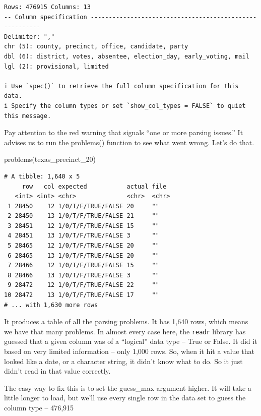 \documentclass[
  letterpaper,
  DIV=11,
  numbers=noendperiod]{scrreprt}
\newenvironment{Shaded}{\begin{snugshade}}{\end{snugshade}}
\newcommand{\FunctionTok}[1]{\textcolor[rgb]{0.28,0.35,0.67}{#1}}
\newcommand{\NormalTok}[1]{\textcolor[rgb]{0.00,0.23,0.31}{#1}}
\begin{document}
\begin{verbatim}
Rows: 476915 Columns: 13
-- Column specification --------------------------------------------------------
Delimiter: ","
chr (5): county, precinct, office, candidate, party
dbl (6): district, votes, absentee, election_day, early_voting, mail
lgl (2): provisional, limited

i Use `spec()` to retrieve the full column specification for this data.
i Specify the column types or set `show_col_types = FALSE` to quiet this message.
\end{verbatim}

Pay attention to the red warning that signals ``one or more parsing
issues.'' It advises us to run the problems() function to see what went
wrong. Let's do that.

\begin{Shaded}
\begin{Highlighting}[]
\FunctionTok{problems}\NormalTok{(texas\_precinct\_20)}
\end{Highlighting}
\end{Shaded}

\begin{verbatim}
# A tibble: 1,640 x 5
     row   col expected           actual file 
   <int> <int> <chr>              <chr>  <chr>
 1 28450    12 1/0/T/F/TRUE/FALSE 20     ""   
 2 28450    13 1/0/T/F/TRUE/FALSE 21     ""   
 3 28451    12 1/0/T/F/TRUE/FALSE 15     ""   
 4 28451    13 1/0/T/F/TRUE/FALSE 3      ""   
 5 28465    12 1/0/T/F/TRUE/FALSE 20     ""   
 6 28465    13 1/0/T/F/TRUE/FALSE 20     ""   
 7 28466    12 1/0/T/F/TRUE/FALSE 15     ""   
 8 28466    13 1/0/T/F/TRUE/FALSE 3      ""   
 9 28472    12 1/0/T/F/TRUE/FALSE 22     ""   
10 28472    13 1/0/T/F/TRUE/FALSE 17     ""   
# ... with 1,630 more rows
\end{verbatim}

It produces a table of all the parsing problems. It has 1,640 rows,
which means we have that many problems. In almost every case here, the
\texttt{readr} library has guessed that a given column was of a
``logical'' data type -- True or False. It did it based on very limited
information -- only 1,000 rows. So, when it hit a value that looked like
a date, or a character string, it didn't know what to do. So it just
didn't read in that value correctly.

The easy way to fix this is to set the guess\_max argument higher. It
will take a little longer to load, but we'll use every single row in the
data set to guess the column type -- 476,915
\end{document}
